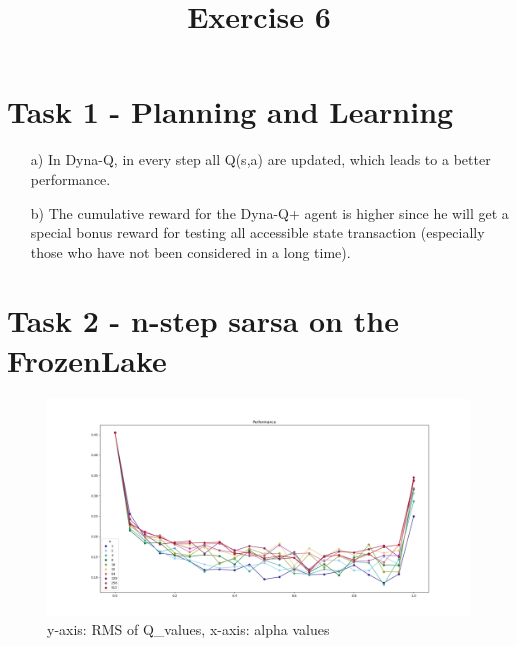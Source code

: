 \documentclass[a4paper]{article}
\date{}
\author{}
\title{\textbf{Exercise 6}}
\begin{document}
\maketitle 
\thispagestyle{fancy}

\section*{Task 1 - Planning and Learning}

\begin{enumerate}
	\item[a)] In Dyna-Q, in every step all Q(s,a) are updated, which leads to a better performance.
	\item[b)] The cumulative reward for the Dyna-Q+ agent is higher since he will get a special bonus reward for testing all accessible state transaction (especially those who have not been considered in a long time). 
\end{enumerate}

\section*{Task 2 - n-step sarsa on the FrozenLake}
\begin{figure}[!ht]
	\centering
	\includegraphics[width=0.7\linewidth]{ex6_2}
	\caption{y-axis: RMS of Q\_values, x-axis: alpha values}
	\label{fig:ex62}
\end{figure}
\end{document}
